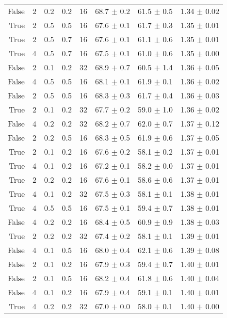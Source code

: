 \begin{table}[h]
\begin{tabular}{rrllrlll}
False & 2 & 0.2 & 0.2 & 16 & 68.7 $\pm$ 0.2 & 61.5 $\pm$ 0.5 & 1.34 $\pm$ 0.02 \\
True & 2 & 0.5 & 0.5 & 16 & 67.6 $\pm$ 0.1 & 61.7 $\pm$ 0.3 & 1.35 $\pm$ 0.01 \\
True & 2 & 0.5 & 0.7 & 16 & 67.6 $\pm$ 0.1 & 61.1 $\pm$ 0.6 & 1.35 $\pm$ 0.01 \\
True & 4 & 0.5 & 0.7 & 16 & 67.5 $\pm$ 0.1 & 61.0 $\pm$ 0.6 & 1.35 $\pm$ 0.00 \\
False & 2 & 0.1 & 0.2 & 32 & 68.9 $\pm$ 0.7 & 60.5 $\pm$ 1.4 & 1.36 $\pm$ 0.05 \\
False & 4 & 0.5 & 0.5 & 16 & 68.1 $\pm$ 0.1 & 61.9 $\pm$ 0.1 & 1.36 $\pm$ 0.02 \\
False & 2 & 0.5 & 0.5 & 16 & 68.3 $\pm$ 0.3 & 61.7 $\pm$ 0.4 & 1.36 $\pm$ 0.03 \\
True & 2 & 0.1 & 0.2 & 32 & 67.7 $\pm$ 0.2 & 59.0 $\pm$ 1.0 & 1.36 $\pm$ 0.02 \\
False & 4 & 0.2 & 0.2 & 32 & 68.2 $\pm$ 0.7 & 62.0 $\pm$ 0.7 & 1.37 $\pm$ 0.12 \\
False & 2 & 0.2 & 0.5 & 16 & 68.3 $\pm$ 0.5 & 61.9 $\pm$ 0.6 & 1.37 $\pm$ 0.05 \\
True & 2 & 0.1 & 0.2 & 16 & 67.6 $\pm$ 0.2 & 58.1 $\pm$ 0.2 & 1.37 $\pm$ 0.01 \\
True & 4 & 0.1 & 0.2 & 16 & 67.2 $\pm$ 0.1 & 58.2 $\pm$ 0.0 & 1.37 $\pm$ 0.01 \\
True & 2 & 0.2 & 0.2 & 16 & 67.6 $\pm$ 0.1 & 58.6 $\pm$ 0.6 & 1.37 $\pm$ 0.01 \\
True & 4 & 0.1 & 0.2 & 32 & 67.5 $\pm$ 0.3 & 58.1 $\pm$ 0.1 & 1.38 $\pm$ 0.01 \\
True & 4 & 0.5 & 0.5 & 16 & 67.5 $\pm$ 0.1 & 59.4 $\pm$ 0.7 & 1.38 $\pm$ 0.01 \\
False & 4 & 0.2 & 0.2 & 16 & 68.4 $\pm$ 0.5 & 60.9 $\pm$ 0.9 & 1.38 $\pm$ 0.03 \\
True & 2 & 0.2 & 0.2 & 32 & 67.4 $\pm$ 0.2 & 58.1 $\pm$ 0.1 & 1.39 $\pm$ 0.01 \\
False & 4 & 0.1 & 0.5 & 16 & 68.0 $\pm$ 0.4 & 62.1 $\pm$ 0.6 & 1.39 $\pm$ 0.08 \\
False & 2 & 0.1 & 0.2 & 16 & 67.9 $\pm$ 0.3 & 59.4 $\pm$ 0.7 & 1.40 $\pm$ 0.01 \\
False & 2 & 0.1 & 0.5 & 16 & 68.2 $\pm$ 0.4 & 61.8 $\pm$ 0.6 & 1.40 $\pm$ 0.04 \\
False & 4 & 0.1 & 0.2 & 16 & 67.9 $\pm$ 0.4 & 59.1 $\pm$ 0.1 & 1.40 $\pm$ 0.01 \\
True & 4 & 0.2 & 0.2 & 32 & 67.0 $\pm$ 0.0 & 58.0 $\pm$ 0.1 & 1.40 $\pm$ 0.00 \\

\end{tabular}
\end{table}
